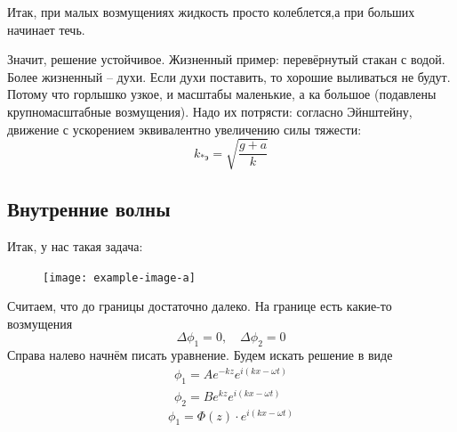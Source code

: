 Итак, при малых возмущениях жидкость просто колеблется,а при больших начинает течь.

Значит, решение устойчивое.
Жизненный пример: перевёрнутый стакан с водой.
Более жизненный -- духи.
Если духи поставить, то хорошие выливаться не будут.
Потому что горлышко узкое, и масштабы маленькие, а ка большое (подавлены крупномасштабные возмущения).
Надо их потрясти: согласно Эйнштейну, движение с ускорением эквивалентно увеличению силы тяжести:
\begin{equation}
    k_{*\text{э}} = \sqrt{\frac{g+a}{k}}
\end{equation}


\subsection{Внутренние волны}






Итак, у нас такая задача:
\begin{figure}[H]
    \centering
    \texttt{[image: example-image-a]}
    \caption{}
    \label{fig:figure1}
\end{figure}
Считаем, что до границы достаточно далеко.
На границе есть какие-то возмущения
\begin{equation}
    \Delta\phi_1 = 0, \quad \Delta\phi_2 = 0
\end{equation}
Справа налево начнём писать уравнение.
Будем искать решение в виде
\begin{gather}
    \phi_1 = A e^{-kz} e^{i(kx-\omega t)}\\
    \phi_2 = B e^{kz} e^{i(kx-\omega t)}
\end{gather}
\begin{equation}
    \phi_1 = \Phi(z)\cdot e^{i(kx-\omega t)}
\end{equation}

